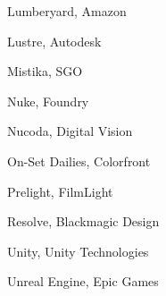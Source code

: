 Lumberyard, Amazon

Lustre, Autodesk

Mistika, SGO

Nuke, Foundry

Nucoda, Digital Vision

On-Set Dailies, Colorfront

Prelight, FilmLight

Resolve, Blackmagic Design

Unity, Unity Technologies

Unreal Engine, Epic Games

